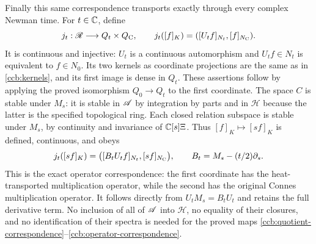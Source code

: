 Finally this same correspondence transports exactly through every
complex Newman time. For $t\in\mathbb C$, define
\begin{equation}
 j_t:\mathscr R\longrightarrow Q_t\times Q_{\rm C},\qquad
 j_t([f]_K)=([U_tf]_{N_t},[f]_{N_{\rm C}}).
 \label{ccb:heat-correspondence}
\end{equation}
It is continuous and injective: $U_t$ is a continuous automorphism
and $U_tf\in N_t$ is equivalent to $f\in N_0$. Its two kernels as
coordinate projections are the same as in \eqref{ccb:kernels}, and its
first image is dense in $Q_t$. These assertions follow by applying
the proved isomorphism $Q_0\to Q_t$ to the first coordinate.
The space $C$ is stable under $M_s$: it is stable in $\mathscr A$ by
integration by parts and in $\mathcal H$ because the latter is the
specified topological ring. Each closed relation subspace is stable
under $M_s$, by continuity and invariance of $\mathbb C[s]\Xi$.
Thus $[f]_K\mapsto[sf]_K$ is defined, continuous, and obeys
\begin{equation}
 j_t([sf]_K)=
 \bigl([B_tU_tf]_{N_t},[sf]_{N_{\rm C}}\bigr),
 \qquad B_t=M_s-(t/2)\partial_s.
 \label{ccb:operator-correspondence}
\end{equation}
This is the exact operator correspondence: the first coordinate has
the heat-transported multiplication operator, while the second has
the original Connes multiplication operator. It follows directly from
$U_tM_s=B_tU_t$ and retains the full derivative term. No inclusion of
all of $\mathscr A$ into $\mathcal H$, no equality of their closures, and no
identification of their spectra is needed for the proved maps
\eqref{ccb:quotient-correspondence}--\eqref{ccb:operator-correspondence}.
